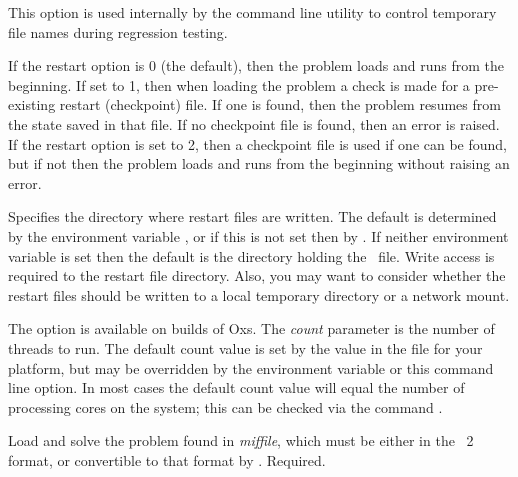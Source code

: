 \begin{description}
  This option is used internally by the 
  command line utility to control temporary file names during regression
  testing.
\item[\optkey{-restart \boa 0\pipe 1\pipe 2\bca\index{simulation~3D!restarting}}]
  If the restart option is 0 (the default), then the problem loads and
  runs from the beginning.  If set to 1, then when loading the problem a
  check is made for a pre-existing restart (checkpoint) file.  If one is
  found, then the problem resumes from the state saved in that file.  If
  no checkpoint file is found, then an error is raised.  If the restart
  option is set to 2, then a checkpoint file is used if one can be
  found, but if not then the problem loads and runs from the beginning
  without raising an error.
\item[\optkey{-restartfiledir dir}]
  Specifies the directory where restart files are written.
  The default is determined by the environment variable
  ,
  or if this is not set then by
  .  If
  neither environment variable is set then the default is the
  directory holding the \MIF\ file.  Write access is required to the
  restart file directory.  Also, you may want to consider whether the
  restart files should be written to a local temporary directory or a
  network mount.
\item[\optkey{-threads \boa count\bca}]
  The option is available on
   builds of Oxs.
  The \textit{count} parameter is the number of threads to run.  The
  default count value is set by the  value in
  the  file for your platform, but may be
  overridden by the
  environment variable or this
  command line option.  In most cases the default count value will
  equal the number of processing cores on the system; this can be
  checked via the command .
\item[\optkey{miffile}]
  Load and solve the problem found in {\em miffile}, which must be
  either in the \MIF~2 format, or convertible to that format by 
  .  Required.
\end{description}

